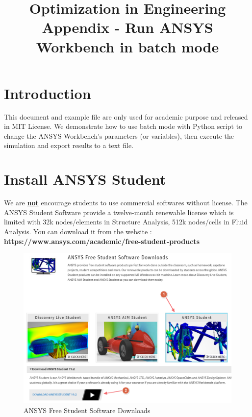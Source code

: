 \documentclass[12pt]{kjleehw}
\begin{document}
\begin{CJK}{UTF8}{bkai} 
\title{\textbf{Optimization in Engineering \\ Appendix - Run ANSYS Workbench in batch mode}}


\section{Introduction}

This document and example file are only used for academic purpose and released in MIT License. We demonstrate how to use batch mode with Python script to change the ANSYS Workbench's parameters (or variables), then execute the simulation and export results to a text file.

\section{Install ANSYS Student}

We are \underline{\textbf{not}} encourage students to use commercial softwares without license. The ANSYS Student Software provide a twelve-month renewable license which is limited with 32k nodes/elements in Structure Analysis, 512k nodes/cells in Fluid Analysis. You can 
download it from the website : \textbf{https://www.ansys.com/academic/free-student-products}

\begin{figure}[h]
	\centering
	\includegraphics[scale=0.4]{figure/download_ansys.png}
	\caption{ANSYS Free Student Software Downloads}
	\label{fig:download_ansys}
\end{figure}


\end{CJK}
\end{document}
